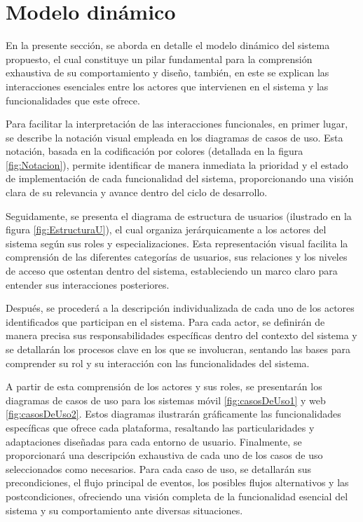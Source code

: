 \section{Modelo dinámico}	
\label{cap:modDinamico}

En la presente sección, se aborda en detalle el modelo dinámico del sistema propuesto, el cual constituye un pilar fundamental para la comprensión exhaustiva de su comportamiento y diseño, también, en este se explican las interacciones esenciales entre los actores que intervienen en el sistema y las funcionalidades que este ofrece.


Para facilitar la interpretación de las interacciones funcionales, en primer lugar, se describe la notación visual empleada en los diagramas de casos de uso. Esta notación, basada en la codificación por colores (detallada en la figura \ref{fig:Notacion}), permite identificar de manera inmediata la prioridad y el estado de implementación de cada funcionalidad del sistema, proporcionando una visión clara de su relevancia y avance dentro del ciclo de desarrollo.


Seguidamente, se presenta el diagrama de estructura de usuarios (ilustrado en la figura \ref{fig:EstructuraU}), el cual organiza jerárquicamente a los actores del sistema según sus roles y especializaciones. Esta representación visual facilita la comprensión de las diferentes categorías de usuarios, sus relaciones y los niveles de acceso que ostentan dentro del sistema, estableciendo un marco claro para entender sus interacciones posteriores.


Después, se procederá a la descripción individualizada de cada uno de los actores identificados que participan en el sistema. Para cada actor, se definirán de manera precisa sus responsabilidades específicas dentro del contexto del sistema y se detallarán los procesos clave en los que se involucran, sentando las bases para comprender su rol y su interacción con las funcionalidades del sistema.


A partir de esta comprensión de los actores y sus roles, se presentarán los diagramas de casos de uso para los sistemas móvil \ref{fig:casosDeUso1}  y web \ref{fig:casosDeUso2}. Estos diagramas ilustrarán gráficamente las funcionalidades específicas que ofrece cada plataforma, resaltando las particularidades y adaptaciones diseñadas para cada entorno de usuario.
Finalmente, se proporcionará una descripción exhaustiva de cada uno de los casos de uso seleccionados como necesarios. Para cada caso de uso, se detallarán sus precondiciones, el flujo principal de eventos, los posibles flujos alternativos y las postcondiciones, ofreciendo una visión completa de la funcionalidad esencial del sistema y su comportamiento ante diversas situaciones.


